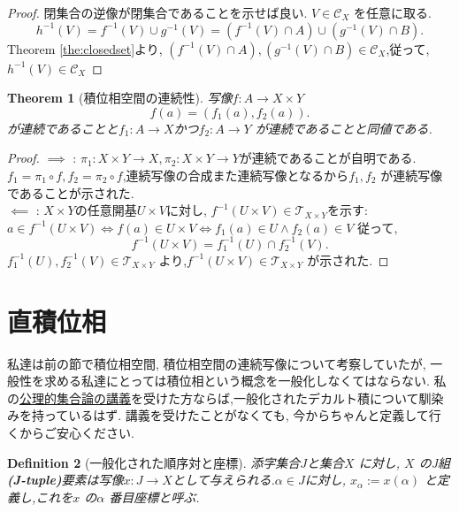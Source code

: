 \documentclass[dvipdfmx]{jbook}
\newtheorem{theorem}{Theorem}[section]
\newtheorem{definition}[theorem]{Definition}
\theoremstyle{remark}
\theoremstyle{plain}
\begin{document}
\begin{proof}
	閉集合の逆像が閉集合であることを示せば良い.
	$V\in \mathcal{C}_X$ を任意に取る.
	\[
	h^{-1}(V) =f^{-1}(V) \cup g^{-1}(V) = \left( f^{-1}(V) \cap A \right) \cup \left( g^{-1}(V) \cap B \right) 
	.\] 
	Theorem \ref{the:closedset}より, $\left( f^{-1}(V) \cap A \right),\left( g^{-1}(V) \cap B \right) \in \mathcal{C}_X $,従って,$h^{-1}(V) \in \mathcal{C}_X$
\end{proof}

\begin{theorem}[積位相空間の連続性]
	写像$f:A \to X\times Y$\[
	f(a)=\left( f_1(a),f_2(a) \right) 
	.\] 	
	が連続であることと$f_1 : A\to X$かつ$f_2 : A \to Y$ が連続であることと同値である.
\end{theorem}

\begin{proof}
	$\implies$ : $\pi_1 : X\times Y \to X,\pi_2 : X\times Y \to Y$が連続であることが自明である. $f_1=\pi_1 \circ f, f_2=\pi_2 \circ f $,連続写像の合成また連続写像となるから$f_1,f_2$ が連続写像であることが示された.\\
	$\impliedby$ : $X\times Y$の任意開基$U\times V$に対し, $f^{-1}\left( U\times V \right) \in \mathcal{T}_{X\times Y}$を示す: $a \in f^{-1}(U\times V) \iff f(a) \in U\times V \iff f_1(a) \in U \land f_2(a) \in V$
	従って,
	\[
	f^{-1}(U\times V) = f_1^{-1}(U) \cap f_2^{-1}(V)
	.\] 
	$f_1^{-1}(U),f_2^{-1}(V) \in \mathcal{T}_{X\times Y}$ より,$f^{-1}(U\times V) \in \mathcal{T}_{X\times Y}$ が示された.
\end{proof}

\section{直積位相}%
\label{sec:直積位相}
私達は前の節で積位相空間, 積位相空間の連続写像について考察していたが, 一般性を求める私達にとっては積位相という概念を一般化しなくてはならない. 私の\textcolor{red}{\href{https://top-xiao.github.io/blog}{公理的集合論の講義}}を受けた方ならば,一般化されたデカルト積について馴染みを持っているはず. 講義を受けたことがなくても, 今からちゃんと定義して行くからご安心ください.

\begin{definition}[一般化された順序対と座標]
	添字集合$J$と集合$X$ に対し, $X$ のJ組 \textbf{(J-tuple)}要素は写像$x:J\to X$として与えられる.$\alpha \in J$に対し, $x_{\alpha}:=x\left( \alpha \right) $ と定義し,これを$x$ の$\alpha$ 番目座標と呼ぶ.
\end{definition}
\end{document}
